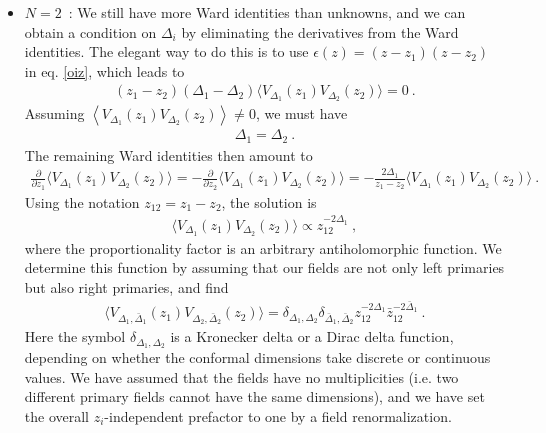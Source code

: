 \documentclass[12pt, a4paper, notitlepage, twoside]{report}
\numberwithin{equation}{section}
\theoremstyle{break}
\begin{document}
\begin{itemize}
\item $\boxed{N=2}$\ : We still have more Ward identities than unknowns, and we can obtain a condition on $\Delta_i$ by eliminating the derivatives from the Ward identities.
The elegant way to do this is to use $\epsilon(z)=(z-z_1)(z-z_2)$ in eq. \eqref{oiz}, which leads to 
\begin{align}
 (z_1-z_2)(\Delta_1-\Delta_2)\Big\langle V_{\Delta_1}(z_1)V_{\Delta_2}(z_2)\Big\rangle =0\ .
\end{align}
Assuming $\left\langle V_{\Delta_1}(z_1)V_{\Delta_2}(z_2)\right\rangle\neq 0$, we must have 
\begin{align}
 \Delta_1 = \Delta_2 \ . 
\label{ded}
\end{align}
The remaining Ward identities then amount to 
\begin{align}
 \frac{\partial}{\partial z_1}\Big\langle V_{\Delta_1}(z_1)V_{\Delta_2}(z_2)\Big\rangle = - \frac{\partial}{\partial z_2}\Big\langle V_{\Delta_1}(z_1)V_{\Delta_2}(z_2)\Big\rangle = -\frac{2\Delta_1}{z_1-z_2} \Big\langle V_{\Delta_1}(z_1)V_{\Delta_2}(z_2)\Big\rangle\ .
\end{align}
Using the notation $z_{12}=z_1-z_2$, the solution is
\begin{align}
 \Big\langle V_{\Delta_1}(z_1)V_{\Delta_2}(z_2)\Big\rangle \propto z_{12}^{-2\Delta_1}\ ,
 \label{fzz}
\end{align}
where the proportionality factor is an arbitrary antiholomorphic function. We determine this function by assuming that our fields are not only left primaries but also right primaries, and find
\begin{align}
 \boxed{ \Big\langle V_{\Delta_1,\bar{\Delta}_1}(z_1) V_{\Delta_2,\bar{\Delta}_2}(z_2)\Big\rangle = \delta_{\Delta_1,\Delta_2}\delta_{\bar{\Delta}_1,\bar{\Delta}_2} z_{12}^{-2\Delta_1}\bar z_{12}^{-2\bar \Delta_1} }\ .
 \label{eq:2pt}
\end{align}
Here the symbol $\delta_{\Delta_1,\Delta_2}$ is a Kronecker delta or a Dirac delta function, depending on whether the conformal dimensions take discrete or continuous values. We have assumed that the fields have no multiplicities (i.e. two different primary fields cannot have the same dimensions), 
and we have set the overall $z_i$-independent prefactor to one by a field renormalization.


\end{itemize}
\end{document}
